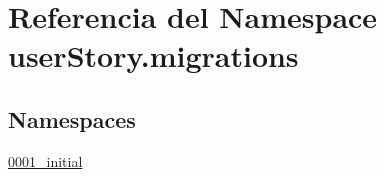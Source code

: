 \hypertarget{namespaceuser_story_1_1migrations}{}\section{Referencia del Namespace user\+Story.\+migrations}
\label{namespaceuser_story_1_1migrations}
\subsection*{Namespaces}
\begin{DoxyCompactItemize}
\item 
 \hyperlink{namespaceuser_story_1_1migrations_1_10001__initial}{0001\+\_\+initial}
\end{DoxyCompactItemize}
